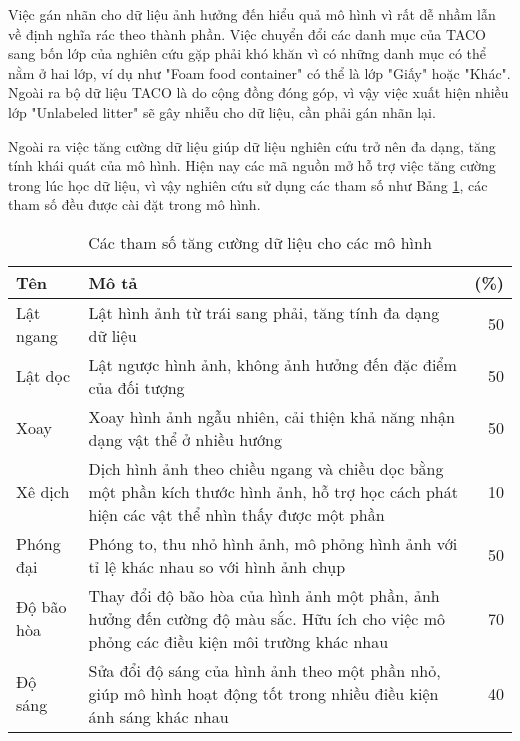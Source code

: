 \documentclass[../the.tex]{subfiles}
\begin{document}
\bigskip

{\fontsize{13}{12} \selectfont

	Việc gán nhãn cho dữ liệu ảnh hưởng đến hiểu quả mô hình vì rất dễ nhầm lẫn về định nghĩa rác theo thành phần.
	Việc chuyển đổi các danh mục của TACO sang bốn lớp của nghiên cứu gặp phải khó khăn vì có những danh mục có thể nằm ở hai lớp, ví dụ như "Foam food container" có thể là lớp  "Giấy" hoặc "Khác".
	Ngoài ra bộ dữ liệu TACO là do cộng đồng đóng góp, vì vậy việc xuất hiện nhiều lớp "Unlabeled litter" sẽ gây nhiễu cho dữ liệu, cần phải gán nhãn lại.

}

\bigskip

{\fontsize{13}{12} \selectfont
	Ngoài ra việc tăng cường dữ liệu giúp dữ liệu nghiên cứu trở nên đa dạng, tăng tính khái quát của mô hình. Hiện nay các mã nguồn mở hỗ trợ việc tăng cường trong lúc học dữ liệu, vì vậy nghiên cứu sử dụng các tham số như Bảng \ref{tab:thamso}, các tham số đều được cài đặt trong mô hình.

}
\begin{table}[H]
	\centering
	\begin{threeparttable}
		\caption{Các tham số tăng cường dữ liệu cho các mô hình}

		\begin{tabular}{lp{10cm}r}
			\hline
			\textbf{Tên}
			           & \textbf{Mô tả}
			           & \textbf{(\%)}
			\\ \hline
			Lật ngang  & Lật hình ảnh từ trái sang phải, tăng tính đa dạng dữ liệu                                                                                    & 50 \\  \hline
			Lật dọc    & Lật ngược hình ảnh, không ảnh hưởng đến đặc điểm của đối tượng                                                                               & 50 \\  \hline
			Xoay       & Xoay hình ảnh ngẫu nhiên, cải thiện khả năng nhận dạng vật thể ở nhiều hướng                                                                 & 50 \\  \hline
			Xê dịch    & Dịch hình ảnh theo chiều ngang và chiều dọc bằng một phần kích thước hình ảnh, hỗ trợ học cách phát hiện các vật thể nhìn thấy được một phần & 10 \\  \hline
			Phóng đại  & Phóng to, thu nhỏ hình ảnh, mô phỏng hình ảnh với tỉ lệ khác nhau so với hình ảnh chụp                                                       & 50 \\  \hline
			Độ bão hòa & Thay đổi độ bão hòa của hình ảnh một phần, ảnh hưởng đến cường độ màu sắc. Hữu ích cho việc mô phỏng các điều kiện môi trường khác nhau      & 70 \\ \hline
			Độ sáng    & Sửa đổi độ sáng của hình ảnh theo một phần nhỏ, giúp mô hình hoạt động tốt trong nhiều điều kiện ánh sáng khác nhau                          & 40 \\ \hline
		\end{tabular}
	\label{tab:thamso}
	\end{threeparttable}
\end{table}
\end{document}
